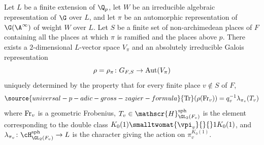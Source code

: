 \begin{theo}
\label{galois for hilbert}
 Let $L$ be a finite extension of $\Q_{p}$, let $W$ be an irreducible algebraic representation of $\G$ over $L$, and   let $\pi$ be an automorphic representation of $\G(\A^{\infty})$ of weight $W$ over $L$.   Let $S$ be a finite set of non-archimedean places of $F$ containing all the places at which $\pi$ is ramified and the places above $p$.
 There exists a  $2$-dimensional
$L$-vector  space $V_{\pi}$ and an absolutely irreducible Galois representation
$$\rho=\rho_{\pi}\colon G_{F,S}\to{\rm Aut}(V_{\pi})$$
uniquely determined by the property that for every finite place $v\notin  S$ of $F$,
\begin{align}\label{trrho}
\source{universal-p-adic-gross-zagier-formula}
{\rm Tr}(\rho({\rm Fr}_{v}))= q_{v}^{-1}\lambda_{\pi_{v}}(T_{v})\end{align}
where ${\rm Fr}_{v}$ is a geometric Frobenius,   $T_{v}\in \mathscr{H}^{\rm sph}_{\GL_{2}(F_{v})}$ is the element corresponding to the double class $K_{0}(1)\smalltwomat {\vpi_{v}}{}{}1K_{0}(1)$, and $\lambda_{\pi_{v}}\colon \cH_{\GL_{2}(F_{v})}^{\rm sph}\to L$ is the character giving the action  on $\pi_{v}^{K_{0}(1)}$.


\end{theo}
